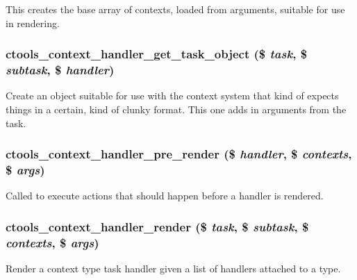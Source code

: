This creates the base array of contexts, loaded from arguments, suitable for use in rendering. \hypertarget{context-task-handler_8inc_a79cea3fa99256e4d46406e9e581c19f7}{
\subsubsection[{ctools\_\-context\_\-handler\_\-get\_\-task\_\-object}]{\setlength{\rightskip}{0pt plus 5cm}ctools\_\-context\_\-handler\_\-get\_\-task\_\-object (\$ {\em task}, \/  \$ {\em subtask}, \/  \$ {\em handler})}}
\label{context-task-handler_8inc_a79cea3fa99256e4d46406e9e581c19f7}
Create an object suitable for use with the context system that kind of expects things in a certain, kind of clunky format. This one adds in arguments from the task. \hypertarget{context-task-handler_8inc_ae623bc36eda278a79508f16d2fb4b867}{
\subsubsection[{ctools\_\-context\_\-handler\_\-pre\_\-render}]{\setlength{\rightskip}{0pt plus 5cm}ctools\_\-context\_\-handler\_\-pre\_\-render (\$ {\em handler}, \/  \$ {\em contexts}, \/  \$ {\em args})}}
\label{context-task-handler_8inc_ae623bc36eda278a79508f16d2fb4b867}
Called to execute actions that should happen before a handler is rendered. \hypertarget{context-task-handler_8inc_ab312cb431a0ff2c79ef6070eb45d339f}{
\subsubsection[{ctools\_\-context\_\-handler\_\-render}]{\setlength{\rightskip}{0pt plus 5cm}ctools\_\-context\_\-handler\_\-render (\$ {\em task}, \/  \$ {\em subtask}, \/  \$ {\em contexts}, \/  \$ {\em args})}}
\label{context-task-handler_8inc_ab312cb431a0ff2c79ef6070eb45d339f}
Render a context type task handler given a list of handlers attached to a type.


